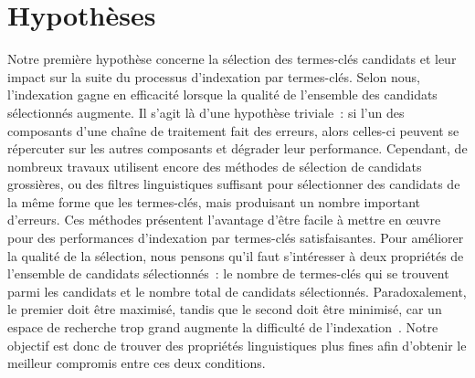 
  \section{Hypothèses}
  \label{sec:main-introduction-hypothesis}
    Notre première hypothèse concerne la sélection des termes-clés candidats et
    leur impact sur la suite du processus d'indexation par termes-clés. Selon
    nous, l'indexation gagne en efficacité lorsque la qualité de l'ensemble des
    candidats sélectionnés augmente.
    Il s'agit là d'une hypothèse triviale~: si l'un des composants d'une chaîne
    de traitement fait des erreurs, alors celles-ci peuvent se répercuter sur
    les autres composants et dégrader leur performance. Cependant, de nombreux
    travaux utilisent encore des méthodes de sélection de candidats grossières,
    ou des filtres linguistiques suffisant pour sélectionner des candidats
    de la même forme que les termes-clés, mais produisant un nombre important 
    d'erreurs. Ces méthodes présentent l'avantage d'être facile à mettre en
    \oe{}uvre pour des performances d'indexation par termes-clés satisfaisantes.
    Pour améliorer la qualité de la sélection, nous pensons qu'il faut
    s'intéresser à deux propriétés de l'ensemble de candidats sélectionnés~: le
    nombre de termes-clés qui se trouvent parmi les candidats et le nombre total
    de candidats sélectionnés. Paradoxalement, le premier doit être maximisé,
    tandis que le second doit être minimisé, car un espace de recherche trop
    grand augmente la difficulté de
    l'indexation~\cite{hasan2014state_of_the_art}.
    Notre objectif est donc de trouver des propriétés linguistiques plus fines
    afin d'obtenir le meilleur compromis entre ces deux conditions.
    
